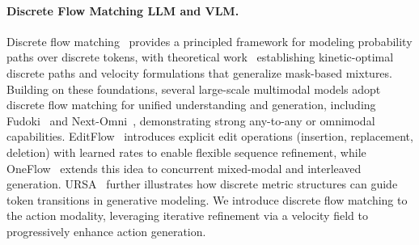\paragraph{Discrete Flow Matching LLM and VLM.}
Discrete flow matching~\citep{gat2024discrete} provides a principled framework for modeling probability paths over discrete tokens, with theoretical work~\citep{shaul2024flow} establishing kinetic-optimal discrete paths and velocity formulations that generalize mask-based mixtures.
Building on these foundations, several large-scale multimodal models adopt discrete flow matching for unified understanding and generation, including Fudoki~\citep{wang2025fudoki} and Next-Omni~\citep{luo2025next}, demonstrating strong any-to-any or omnimodal capabilities.
EditFlow~\citep{havasi2025edit} introduces explicit edit operations (insertion, replacement, deletion) with learned rates to enable flexible sequence refinement, while OneFlow~\citep{nguyen2025oneflow} extends this idea to concurrent mixed-modal and interleaved generation.
URSA~\citep{deng2025uniform} further illustrates how discrete metric structures can guide token transitions in generative modeling.
We introduce discrete flow matching to the action modality, leveraging iterative refinement via a velocity field to progressively enhance action generation.